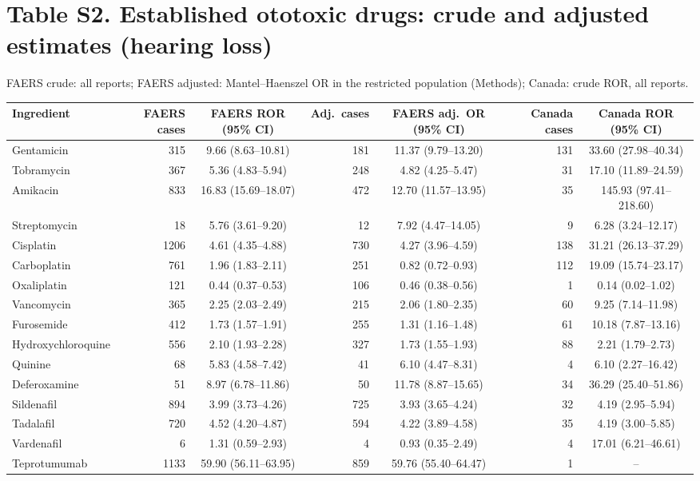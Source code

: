 \documentclass[10pt]{article}
\begin{document}
\section*{Table S2. Established ototoxic drugs: crude and adjusted estimates (hearing loss)}
FAERS crude: all reports; FAERS adjusted: Mantel--Haenszel OR in the restricted population (Methods); Canada: crude ROR, all reports.
\begin{longtable}{lrcrcrc}
\toprule
Ingredient & FAERS cases & FAERS ROR (95\% CI) & Adj.\ cases & FAERS adj.\ OR (95\% CI) & Canada cases & Canada ROR (95\% CI) \\
\midrule
Gentamicin & 315 & 9.66 (8.63--10.81) & 181 & 11.37 (9.79--13.20) & 131 & 33.60 (27.98--40.34) \\
Tobramycin & 367 & 5.36 (4.83--5.94) & 248 & 4.82 (4.25--5.47) & 31 & 17.10 (11.89--24.59) \\
Amikacin & 833 & 16.83 (15.69--18.07) & 472 & 12.70 (11.57--13.95) & 35 & 145.93 (97.41--218.60) \\
Streptomycin & 18 & 5.76 (3.61--9.20) & 12 & 7.92 (4.47--14.05) & 9 & 6.28 (3.24--12.17) \\
Cisplatin & 1206 & 4.61 (4.35--4.88) & 730 & 4.27 (3.96--4.59) & 138 & 31.21 (26.13--37.29) \\
Carboplatin & 761 & 1.96 (1.83--2.11) & 251 & 0.82 (0.72--0.93) & 112 & 19.09 (15.74--23.17) \\
Oxaliplatin & 121 & 0.44 (0.37--0.53) & 106 & 0.46 (0.38--0.56) & 1 & 0.14 (0.02--1.02) \\
Vancomycin & 365 & 2.25 (2.03--2.49) & 215 & 2.06 (1.80--2.35) & 60 & 9.25 (7.14--11.98) \\
Furosemide & 412 & 1.73 (1.57--1.91) & 255 & 1.31 (1.16--1.48) & 61 & 10.18 (7.87--13.16) \\
Hydroxychloroquine & 556 & 2.10 (1.93--2.28) & 327 & 1.73 (1.55--1.93) & 88 & 2.21 (1.79--2.73) \\
Quinine & 68 & 5.83 (4.58--7.42) & 41 & 6.10 (4.47--8.31) & 4 & 6.10 (2.27--16.42) \\
Deferoxamine & 51 & 8.97 (6.78--11.86) & 50 & 11.78 (8.87--15.65) & 34 & 36.29 (25.40--51.86) \\
Sildenafil & 894 & 3.99 (3.73--4.26) & 725 & 3.93 (3.65--4.24) & 32 & 4.19 (2.95--5.94) \\
Tadalafil & 720 & 4.52 (4.20--4.87) & 594 & 4.22 (3.89--4.58) & 35 & 4.19 (3.00--5.85) \\
Vardenafil & 6 & 1.31 (0.59--2.93) & 4 & 0.93 (0.35--2.49) & 4 & 17.01 (6.21--46.61) \\
Teprotumumab & 1133 & 59.90 (56.11--63.95) & 859 & 59.76 (55.40--64.47) & 1 & -- \\
\bottomrule
\end{longtable}
\end{document}

